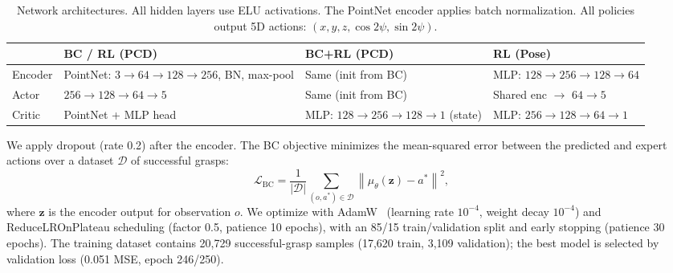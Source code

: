 \documentclass[conference]{IEEEtran}
\begin{document}
\begin{table}[t]
\centering
\caption{Network architectures. All hidden layers use ELU activations. The PointNet encoder applies batch normalization. All policies output 5D actions: $(x,y,z,\cos 2\psi,\sin 2\psi)$.}
\label{tab:architecture}
\setlength{\tabcolsep}{3pt}
\begin{tabular}{@{}lp{2.4cm}p{2.4cm}p{2.0cm}@{}}
\toprule
& \textbf{BC / RL (PCD)} & \textbf{BC+RL (PCD)} & \textbf{RL (Pose)} \\
\midrule
Encoder
  & PointNet: $3\!\to\!64\!\to\!128\!\to\!256$, BN, max-pool
  & Same (init from BC)
  & MLP: $128\!\to\!256\!\to\!128\!\to\!64$ \\[3pt]
Actor
  & $256\!\to\!128\!\to\!64\!\to\!5$
  & Same (init from BC)
  & Shared enc $\to$ $64\!\to\!5$ \\[3pt]
Critic
  & PointNet + MLP head
  & MLP: $128\!\to\!256\!\to\!128\!\to\!1$ (state)
  & MLP: $256\!\to\!128\!\to\!64\!\to\!1$ \\
\bottomrule
\end{tabular}
\end{table}

We apply dropout (rate 0.2) after the encoder.
The BC objective minimizes the mean-squared error between the predicted and expert actions over a dataset $\mathcal{D}$ of successful grasps:
\begin{equation}
    \mathcal{L}_{\text{BC}} = \frac{1}{|\mathcal{D}|}\sum_{(o,a^*)\in\mathcal{D}} \left\| \mu_\theta(\mathbf{z}) - a^* \right\|^2,
\end{equation}
where $\mathbf{z}$ is the encoder output for observation $o$.
We optimize with AdamW~\cite{loshchilov2019adamw} (learning rate $10^{-4}$, weight decay $10^{-4}$) and ReduceLROnPlateau scheduling (factor 0.5, patience 10 epochs), with an 85/15 train/validation split and early stopping (patience 30 epochs).
The training dataset contains 20{,}729 successful-grasp samples (17{,}620 train, 3{,}109 validation); the best model is selected by validation loss (0.051 MSE, epoch 246/250).
\end{document}
